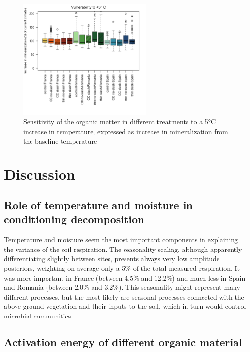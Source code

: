 \documentclass[
]{article}
\begin{document}
\begin{figure}
\centering
\includegraphics[width=0.6\textwidth,height=\textheight]{../Figures/scenario_extrapolation.png}
\caption{Sensitivity of the organic matter in different treatments to a 5°C increase in temperature, expressed as increase in mineralization from the baseline temperature}
\end{figure}

\section{Discussion}\label{discussion}

\subsection{Role of temperature and moisture in conditioning decomposition}\label{role-of-temperature-and-moisture-in-conditioning-decomposition}

Temperature and moisture seem the most important components in explaining the variance of the soil respiration. The seasonality scaling, although apparently differentiating slightly between sites, presents always very low amplitude posteriors, weighting on average only a 5\% of the total measured respiration. It was more important in France (between 4.5\% and 12.2\%) and much less in Spain and Romania (between 2.0\% and 3.2\%). This seasonality might represent many different processes, but the most likely are seasonal processes connected with the above-ground vegetation and their inputs to the soil, which in turn would control microbial communities.

\subsection{Activation energy of different organic material}\label{activation-energy-of-different-organic-material}
\end{document}
